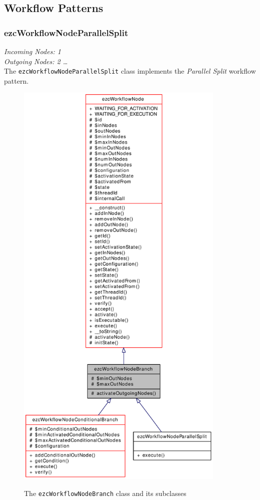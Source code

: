 \subsection{Workflow Patterns}

\subsubsection{ezcWorkflowNodeParallelSplit}

\emph{Incoming Nodes: 1}\\
\emph{Outgoing Nodes: 2 \dots *}\\

The \texttt{ezcWorkflowNodeParallelSplit} class implements the
\emph{Parallel Split} workflow pattern.

\begin{figure}[hbt]
\begin{center}
\includegraphics[width=10cm]{figures/WorkflowNodeBranch}\\[5mm]
\end{center}
\caption{The \texttt{ezcWorkflowNodeBranch} class and its subclasses}
\label{classezcWorkflowNodeBranch}
\end{figure}

